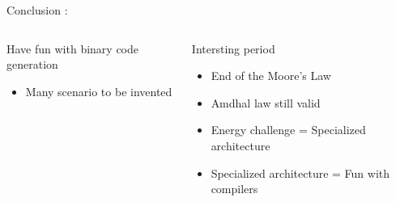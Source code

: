 \begin{Frame}{Conclusion : }
 \begin{columns}[t]
  \begin{column}{\BW}
    \begin{block}{Have fun with binary code generation}
      \begin{itemize}
        \item Many scenario to be invented
      \end{itemize}
    \end{block}
  \end{column}
  \begin{column}{\BW}
    \begin{block}{Intersting period}
      \begin{itemize}
      \item End of the Moore's Law
      \item Amdhal law still valid
      \item Energy challenge = Specialized architecture
      \item Specialized architecture = Fun with compilers
      \end{itemize}
    \end{block}
  \end{column}

 \end{columns}
\end{Frame}

